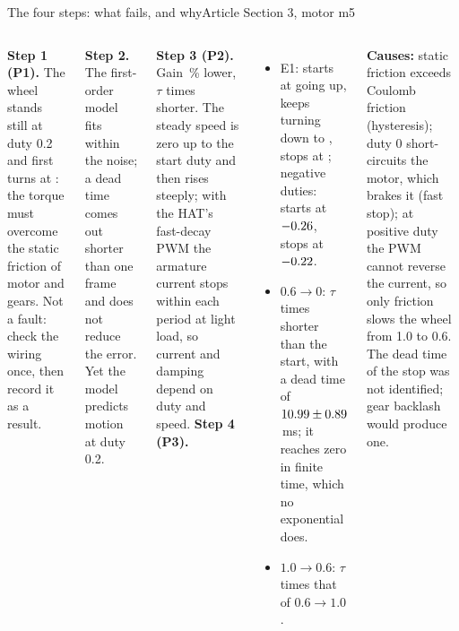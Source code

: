 \begin{frame}{The four steps: what fails, and why}{Article Section 3, motor m5}
  \label{app:step-causes}
  \scriptsize
  \begin{columns}[T]
    \textbf{Step 1 (P1).} The wheel stands still at duty 0.2 and first turns at \StartDuty: the torque must overcome the \alert{static friction} of motor and gears. Not a fault: check the wiring once, then record it as a result.

    \vspace{4pt}
    \textbf{Step 2.} The first-order model fits within the noise; a dead time comes out shorter than one frame and does not reduce the error. Yet the model predicts motion at duty 0.2.

    \vspace{4pt}
    \textbf{Step 3 (P2).} Gain \GainDrop\,\% lower, $\tau$ \TauRatio{} times shorter. The steady speed is zero up to the start duty and then rises steeply; with the HAT's fast-decay PWM the armature current stops within each period at light load, so current and damping depend on duty and speed.
    \textbf{Step 4 (P3).}
    \begin{itemize}\setlength{\itemsep}{2pt}
      \item E1: starts at \StartDuty{} going up, keeps turning down to \LastTurningDuty, stops at \StopDuty; negative duties: starts at $-0.26$, stops at $-0.22$.
      \item $0.6 \to 0$: $\tau$ \StartStopRatio{} times shorter than the start, with a dead time of $10.99 \pm 0.89$\,ms; it reaches zero in finite time, which no exponential does.
      \item $1.0 \to 0.6$: $\tau$ \DownUpRatio{} times that of $0.6 \to 1.0$.
    \end{itemize}
    \textbf{Causes:} static friction exceeds Coulomb friction (hysteresis); duty 0 short-circuits the motor, which brakes it (fast stop); at positive duty the PWM cannot reverse the current, so only friction slows the wheel from 1.0 to 0.6. The dead time of the stop was not identified; gear backlash would produce one.
  \end{columns}
\end{frame}
